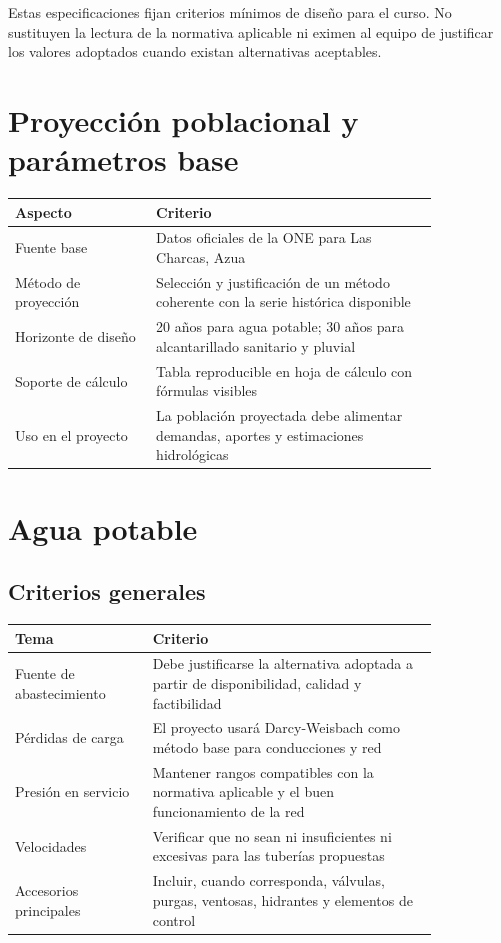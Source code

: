 \documentclass[11pt]{article}
\begin{document}

\begin{warnbox}
Estas especificaciones fijan criterios m\'inimos de dise\~no para el curso. No sustituyen la lectura de la normativa aplicable ni eximen al equipo de justificar los valores adoptados cuando existan alternativas aceptables.
\end{warnbox}

\section{Proyecci\'on poblacional y par\'ametros base}
\begin{center}
\begin{tabular}{p{0.28\linewidth} p{0.56\linewidth}}
\toprule
\textbf{Aspecto} & \textbf{Criterio} \\
\midrule
Fuente base & Datos oficiales de la ONE para Las Charcas, Azua \\
M\'etodo de proyecci\'on & Selecci\'on y justificaci\'on de un m\'etodo coherente con la serie hist\'orica disponible \\
Horizonte de dise\~no & 20 a\~nos para agua potable; 30 a\~nos para alcantarillado sanitario y pluvial \\
Soporte de c\'alculo & Tabla reproducible en hoja de c\'alculo con f\'ormulas visibles \\
Uso en el proyecto & La poblaci\'on proyectada debe alimentar demandas, aportes y estimaciones hidrol\'ogicas \\
\bottomrule
\end{tabular}
\end{center}

\section{Agua potable}
\subsection{Criterios generales}
\begin{center}
\begin{tabular}{p{0.27\linewidth} p{0.57\linewidth}}
\toprule
\textbf{Tema} & \textbf{Criterio} \\
\midrule
Fuente de abastecimiento & Debe justificarse la alternativa adoptada a partir de disponibilidad, calidad y factibilidad \\
P\'erdidas de carga & El proyecto usar\'a Darcy-Weisbach como m\'etodo base para conducciones y red \\
Presi\'on en servicio & Mantener rangos compatibles con la normativa aplicable y el buen funcionamiento de la red \\
Velocidades & Verificar que no sean ni insuficientes ni excesivas para las tuber\'ias propuestas \\
Accesorios principales & Incluir, cuando corresponda, v\'alvulas, purgas, ventosas, hidrantes y elementos de control \\
\bottomrule
\end{tabular}
\end{center}
\end{document}
